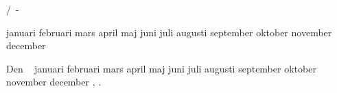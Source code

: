 



\printversion



\the\day/\the\month\ - \the\year

\def\monthname{%
	\ifcase\month 
		\or 
		januari\or 
		februari\or 
		mars\or
		april\or
		maj\or
		juni\or
		juli\or
		augusti\or
		september\or
		oktober\or
		november\or
		december\fi
}
\monthname

\def\datum{%
	\the\day\ \monthname, \the\year
}

Den \datum.







\bye
